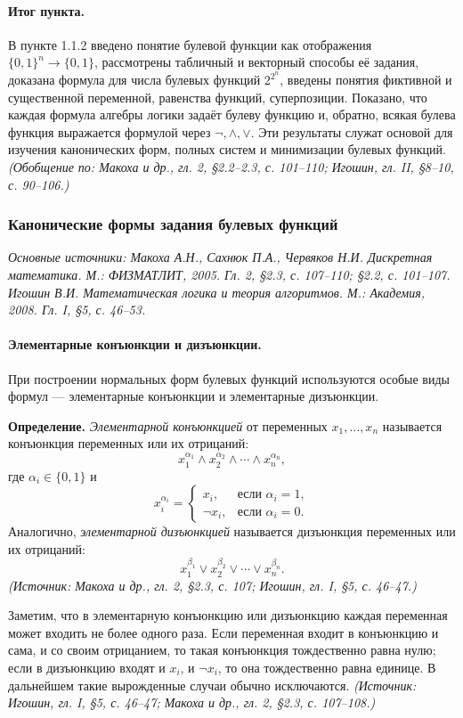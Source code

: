 \documentclass[a4paper,12pt]{article}
\begin{document}
\paragraph{Итог пункта.}
В пункте 1.1.2 введено понятие булевой функции как отображения \(\{0,1\}^n\to\{0,1\}\), рассмотрены табличный и векторный способы её задания, доказана формула для числа булевых функций \(2^{2^n}\), введены понятия фиктивной и существенной переменной, равенства функций, суперпозиции. Показано, что каждая формула алгебры логики задаёт булеву функцию и, обратно, всякая булева функция выражается формулой через \(\neg,\land,\lor\). Эти результаты служат основой для изучения канонических форм, полных систем и минимизации булевых функций.
\textit{(Обобщение по: Макоха и др., гл. 2, §2.2--2.3, с. 101--110; Игошин, гл. II, §8--10, с. 90--106.)}

\subsubsection{Канонические формы задания булевых функций}

\noindent\textit{Основные источники: Макоха А.Н., Сахнюк П.А., Червяков Н.И. Дискретная математика. М.: ФИЗМАТЛИТ, 2005. Гл. 2, §2.3, с. 107--110; §2.2, с. 101--107. Игошин В.И. Математическая логика и теория алгоритмов. М.: Академия, 2008. Гл. I, §5, с. 46--53.}

\paragraph{Элементарные конъюнкции и дизъюнкции.}
При построении нормальных форм булевых функций используются особые виды формул — элементарные конъюнкции и элементарные дизъюнкции.

\textbf{Определение.} \emph{Элементарной конъюнкцией} от переменных \(x_1,\ldots,x_n\) называется конъюнкция переменных или их отрицаний:
\[
x_1^{\alpha_1}\land x_2^{\alpha_2}\land\cdots\land x_n^{\alpha_n},
\]
где \(\alpha_i\in\{0,1\}\) и
\[
x_i^{\alpha_i}=
\begin{cases}
x_i, & \text{если } \alpha_i=1,\\
\neg x_i, & \text{если } \alpha_i=0.
\end{cases}
\]
Аналогично, \emph{элементарной дизъюнкцией} называется дизъюнкция переменных или их отрицаний:
\[
x_1^{\beta_1}\lor x_2^{\beta_2}\lor\cdots\lor x_n^{\beta_n}.
\]
\textit{(Источник: Макоха и др., гл. 2, §2.3, с. 107; Игошин, гл. I, §5, с. 46--47.)}

Заметим, что в элементарную конъюнкцию или дизъюнкцию каждая переменная может входить не более одного раза. Если переменная входит в конъюнкцию и сама, и со своим отрицанием, то такая конъюнкция тождественно равна нулю; если в дизъюнкцию входят и \(x_i\), и \(\neg x_i\), то она тождественно равна единице. В дальнейшем такие вырожденные случаи обычно исключаются.
\textit{(Источник: Игошин, гл. I, §5, с. 46--47; Макоха и др., гл. 2, §2.3, с. 107--108.)}
\end{document}
